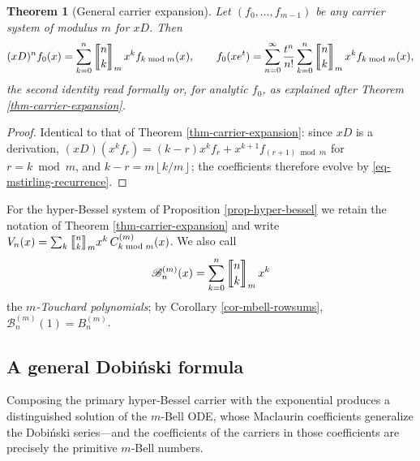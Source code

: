 \documentclass[a4paper]{amsart}
\numberwithin{equation}{section}
\newcommand{\mStirling}[0]{\genfrac{\llbracket}{\rrbracket}{0pt}{}}
\newcommand{\floor}[1]{\left\lfloor #1 \right\rfloor}
\newtheorem{theorem}{Theorem}[section]
\begin{document}
\begin{theorem}[General carrier expansion]\label{thm-general-carrier-expansion}
Let $(f_0, \ldots, f_{m-1})$ be any carrier system of modulus $m$ for $xD$. Then
\[
(xD)^n f_0(x) = \sum_{k=0}^n \mStirling{n}{k}_m\, x^k f_{k \bmod m}(x),
\qquad
f_0(xe^t) = \sum_{n=0}^\infty \frac{t^n}{n!}\sum_{k=0}^n \mStirling{n}{k}_m\, x^k f_{k \bmod m}(x),
\]
the second identity read formally or, for analytic $f_0$, as explained after Theorem \ref{thm-carrier-expansion}.
\end{theorem}
\begin{proof}
Identical to that of Theorem \ref{thm-carrier-expansion}: since $xD$ is a derivation, $(xD)(x^k f_r) = (k-r)x^kf_r + x^{k+1}f_{(r+1) \bmod m}$ for $r = k \bmod m$, and $k - r = m\floor{k/m}$; the coefficients therefore evolve by \eqref{eq-mstirling-recurrence}.
\end{proof}

For the hyper-Bessel system of Proposition \ref{prop-hyper-bessel} we retain the notation of Theorem \ref{thm-carrier-expansion} and write $V_n(x) = \sum_{k} \mStirling{n}{k}_m x^k\, C^{(m)}_{k \bmod m}(x)$. We also call
\[
\mathscr{B}^{(m)}_n(x) = \sum_{k=0}^{n} \mStirling{n}{k}_m\, x^k
\]
the \emph{$m$-Touchard polynomials}; by Corollary \ref{cor-mbell-rowsums}, $\mathscr{B}^{(m)}_n(1) = B^{(m)}_n$.

\subsection{A general Dobi\'nski formula}

Composing the primary hyper-Bessel carrier with the exponential produces a distinguished solution of the $m$-Bell ODE, whose Maclaurin coefficients generalize the Dobi\'nski series---and the coefficients of the carriers in those coefficients are precisely the primitive $m$-Bell numbers.
\end{document}
